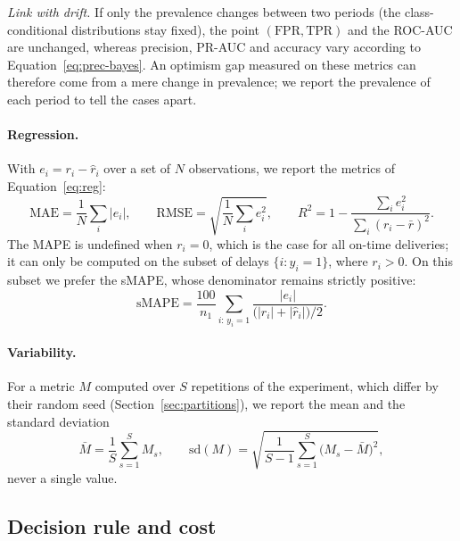 \documentclass[11pt,a4paper]{article}
\theoremstyle{definition}
\begin{document}
\emph{Link with drift.} If only the prevalence changes between two periods (the class-conditional distributions stay fixed), the point $(\mathrm{FPR},\mathrm{TPR})$ and the ROC-AUC are unchanged, whereas precision, PR-AUC and accuracy vary according to Equation~\eqref{eq:prec-bayes}. An optimism gap measured on these metrics can therefore come from a mere change in prevalence; we report the prevalence of each period to tell the cases apart.

\paragraph{Regression.} With $e_i = r_i - \hat{r}_i$ over a set of $N$ observations, we report the metrics of Equation~\eqref{eq:reg}:
\begin{equation}
  \mathrm{MAE} = \frac{1}{N}\sum_i |e_i|, \qquad
  \mathrm{RMSE} = \sqrt{\frac{1}{N}\sum_i e_i^{2}}, \qquad
  R^{2} = 1 - \frac{\sum_i e_i^{2}}{\sum_i (r_i-\bar{r})^{2}}.
  \label{eq:reg}
\end{equation}
The MAPE is undefined when $r_i = 0$, which is the case for all on-time deliveries; it can only be computed on the subset of delays $\{i : y_i = 1\}$, where $r_i > 0$. On this subset we prefer the sMAPE, whose denominator remains strictly positive:
\begin{equation*}
  \mathrm{sMAPE} = \frac{100}{n_1} \sum_{i:\,y_i=1} \frac{|e_i|}{\bigl(|r_i|+|\hat{r}_i|\bigr)/2}.
\end{equation*}

\paragraph{Variability.} For a metric $M$ computed over $S$ repetitions of the experiment, which differ by their random seed (Section~\ref{sec:partitions}), we report the mean and the standard deviation
\begin{equation*}
  \bar{M} = \frac{1}{S}\sum_{s=1}^{S} M_s, \qquad
  \mathrm{sd}(M) = \sqrt{\frac{1}{S-1}\sum_{s=1}^{S} \bigl(M_s-\bar{M}\bigr)^{2}},
\end{equation*}
never a single value.

\subsection{Decision rule and cost}
\label{sec:decision}
\end{document}
